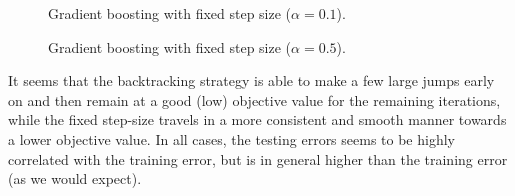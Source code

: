 \begin{figure}[h!tbp]
       \caption{Gradient boosting with fixed step size ($\alpha=0.1$).}
\end{figure}

\begin{figure}[h!tbp]
       \caption{Gradient boosting with fixed step size ($\alpha=0.5$).}
\end{figure}

\newpage
It seems that the backtracking strategy is able to make a few large jumps early
on and then remain at a good (low) objective value for the remaining
iterations, while the fixed step-size travels in a more consistent and smooth
manner towards a lower objective value. In all cases, the testing errors seems
to be highly correlated with the training error, but is in general higher than
the training error (as we would expect).


